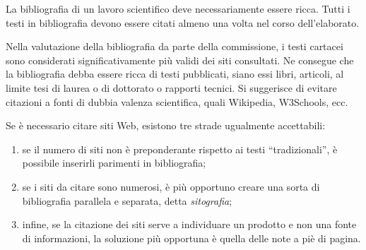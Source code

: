 La bibliografia di un lavoro scientifico deve necessariamente essere ricca. Tutti i testi in bibliografia devono essere citati almeno una volta nel corso dell'elaborato. 

Nella valutazione della bibliografia da parte della commissione, i testi cartacei sono considerati significativamente più validi dei siti consultati. Ne consegue che la bibliografia debba essere ricca di testi pubblicati, siano essi libri, articoli, al limite tesi di laurea o di dottorato o rapporti tecnici. Si suggerisce di evitare citazioni a fonti di dubbia valenza scientifica, quali Wikipedia, W3Schools, ecc.

Se è necessario citare siti Web, esistono tre strade ugualmente accettabili:
\begin{enumerate}
	\item se il numero di siti non è preponderante rispetto ai testi ``tradizionali'', è possibile inserirli parimenti in bibliografia;
	\item se i siti da citare sono numerosi, è più opportuno creare una sorta di bibliografia parallela e separata, detta \textit{sitografia};
	\item infine, se la citazione dei siti serve a individuare un prodotto e non una fonte di informazioni, la soluzione più opportuna è quella delle note a piè di pagina.
\end{enumerate}
